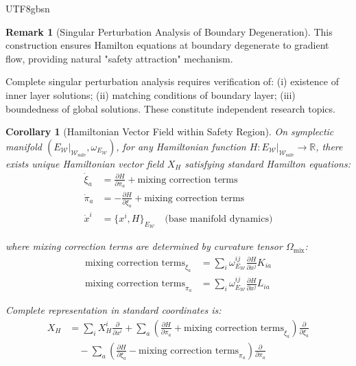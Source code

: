 \documentclass[a4paper,12pt]{extarticle}
\newtheorem{corollary}[theorem]{Corollary}
\theoremstyle{definition}
\newtheorem{remark}{Remark}
\begin{document}
\begin{CJK}{UTF8}{gbsn}
\begin{remark}[Singular Perturbation Analysis of Boundary Degeneration]
This construction ensures Hamilton equations at boundary degenerate to gradient flow, providing natural "safety attraction" mechanism.

Complete singular perturbation analysis requires verification of: (i) existence of inner layer solutions; (ii) matching conditions of boundary layer; (iii) boundedness of global solutions. These constitute independent research topics.
\end{remark}



\begin{corollary}[Hamiltonian Vector Field within Safety Region]
On symplectic manifold $(E_{\mathcal{W}}|_{\mathcal{W}_{\text{safe}}}, \omega_{E_{\mathcal{W}}})$, for any Hamiltonian function $H : E_{\mathcal{W}}|_{\mathcal{W}_{\text{safe}}} \to \mathbb{R}$, there exists unique Hamiltonian vector field $X_H$ satisfying standard Hamilton equations:
\begin{align*}
\dot{\xi}_a &= \frac{\partial H}{\partial \pi_a} + \text{mixing correction terms}\\
\dot{\pi}_a &= -\frac{\partial H}{\partial \xi_a} + \text{mixing correction terms}\\
\dot{x}^i &= \{x^i, H\}_{E_{\mathcal{W}}} \quad \text{(base manifold dynamics)}
\end{align*}

where mixing correction terms are determined by curvature tensor $\Omega_{\text{mix}}$:
\begin{align*}
\text{mixing correction terms}_{\xi_a} &= \sum_{i} \omega^{ij}_{E_{\mathcal{W}}} \frac{\partial H}{\partial x^j} K_{ia}\\
\text{mixing correction terms}_{\pi_a} &= \sum_{i} \omega^{ij}_{E_{\mathcal{W}}} \frac{\partial H}{\partial x^j} L_{ia}
\end{align*}

Complete representation in standard coordinates is:
\begin{align*}
X_H &= \sum_i X_H^i \frac{\partial}{\partial x^i} + \sum_a \left(\frac{\partial H}{\partial \pi_a} + \text{mixing correction terms}_{\xi_a}\right) \frac{\partial}{\partial \xi_a} \\
&\quad - \sum_a \left(\frac{\partial H}{\partial \xi_a} - \text{mixing correction terms}_{\pi_a}\right) \frac{\partial}{\partial \pi_a}
\end{align*}


\end{corollary}
\end{CJK}
\end{document}
